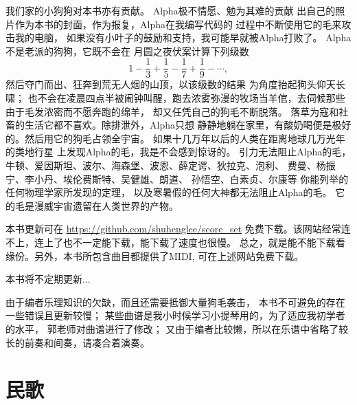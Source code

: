\documentclass[a4paper,twoside]{memoir}
\begin{document}
我们家的小狗狗对本书亦有贡献。
Alpha极不情愿、勉为其难的贡献
出自己的照片作为本书的封面，作为报复，Alpha在我编写代码的
过程中不断使用它的毛来攻击我的电脑，
如果没有小叶子的鼓励和支持，我可能早就被Alpha打败了。
Alpha不是老派的狗狗，它既不会在
月圆之夜伏案计算下列级数
\begin{equation*}
	1 - \frac{1}{3} + \frac{1}{5} - \frac{1}{7} + \frac{1}{9} - \cdots,
\end{equation*}
然后夺门而出、狂奔到荒无人烟的山顶，以该级数的结果
为角度抬起狗头仰天长啸；
也不会在凌晨四点半被闹钟叫醒，跑去浓雾弥漫的牧场当羊倌，去伺候那些由于毛发浓密而不愿奔跑的绵羊，
却又任凭自己的狗毛不断脱落。
落草为寇和社畜的生活它都不喜欢。除排泄外，Alpha只想
静静地躺在家里，有酸奶喝便是极好的。然后用它的狗毛占领全宇宙。
如果十几万年以后的人类在距离地球几万光年的类地行星
上发现Alpha的毛，我是不会感到惊讶的。
引力无法阻止Alpha的毛，
牛顿、爱因斯坦、波尔、海森堡、波恩、薛定谔、狄拉克、泡利、
费曼、杨振宁、李小丹、埃伦费斯特、吴健雄、朗道、
孙悟空、白素贞、尔康等
你能列举的任何物理学家所发现的定理，
以及寒暑假的任何大神都无法阻止Alpha的毛。
它的毛是漫威宇宙遗留在人类世界的产物。

本书更新可在%
\href{https://github.com/shuhenglee/score\_set}%
{\faGithub https://github.com/shuhenglee/score\_set}
免费下载。该网站经常连不上，连上了也不一定能下载，能下载了速度也很慢。
总之，就是能不能下载看缘份。另外，本书所包含曲目都提供了MIDI,
可在上述网站免费下载。

本书将不定期更新...

由于编者乐理知识的欠缺，而且还需要抵御大量狗毛袭击，
本书不可避免的存在一些错误且更新较慢；
某些曲谱是我小时候学习小提琴用的，为了适应我初学者的水平，
郭老师对曲谱进行了修改；
又由于编者比较懒，所以在乐谱中省略了较长的前奏和间奏，请凑合着演奏。
\vfil\break

\pagecolor{Cornsilk} %
\hypertarget{chap:cont}{}
\tableofcontents
\vfill\break

\mainmatter

\chapter{民歌}

\circlefive
\vfil\break











\end{document}
